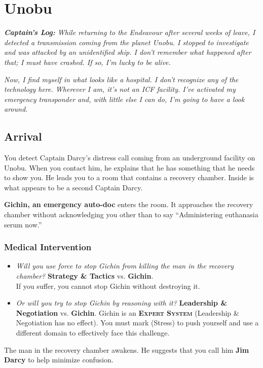 \documentclass[11pt, a5paper, parskip=half-, DIV=12]{scrartcl}
\begin{document}
\section*{Unobu}
\textit{\textbf{Captain's Log:} While returning to the Endeavour after several weeks of leave, I detected a transmission coming from the planet Unobu. I stopped to investigate and was attacked by an unidentified ship. I don't remember what happened after that; I must have crashed. If so, I'm lucky to be alive.}

\textit{Now, I find myself in what looks like a hospital. I don't recognize any of the technology here. Wherever I am, it's not an ICF facility. I've activated my emergency transponder and, with little else I can do, I'm going to have a look around.}

\subsection*{Arrival}
You detect Captain Darcy's distress call coming from an underground facility on Unobu. When you contact him, he explains that he has something that he needs to show you. He leads you to a room that contains a recovery chamber. Inside is what appears to be a second Captain Darcy.

\textbf{Gichin, an emergency auto-doc} enters the room. It approaches the recovery chamber without acknowledging you other than to say ``Administering euthanasia serum now.''

\subsubsection*{Medical Intervention}
\begin{itemize}
	\item \textit{Will you use force to stop Gichin from killing the man in the recovery chamber?} \textbf{Strategy \& Tactics} vs. \textbf{Gichin}. \\ If you suffer, you cannot stop Gichin without destroying it.
	\item \textit{Or will you try to stop Gichin by reasoning with it?} \textbf{Leadership \& Negotiation} vs. \textbf{Gichin}. Gichin is an \textbf{\textsc{Expert System}} (Leadership \& Negotiation has no effect). You must mark  (Stress) to push yourself  and use a different domain to effectively face this challenge.  
\end{itemize}
The man in the recovery chamber awakens. He suggests that you call him \textbf{Jim Darcy} to help minimize confusion.
\newpage
\end{document}
